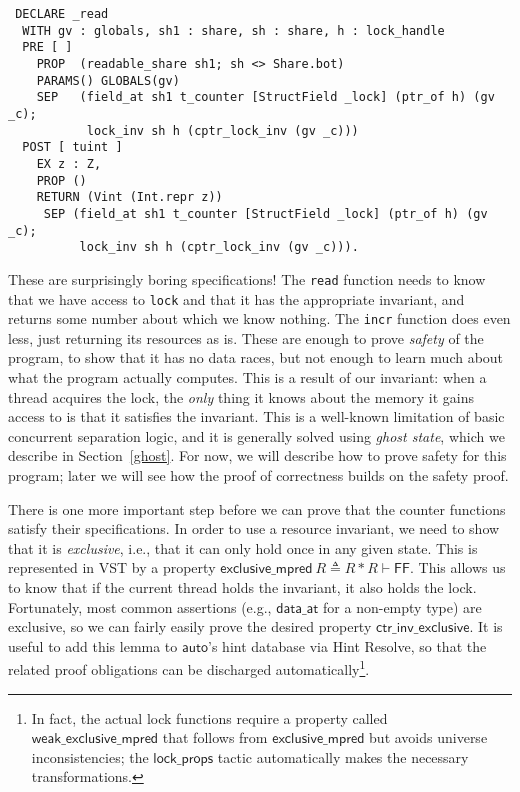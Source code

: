 \documentclass[11pt]{article}
\begin{document}
\begin{verbatim}
 DECLARE _read
  WITH gv : globals, sh1 : share, sh : share, h : lock_handle
  PRE [ ]
    PROP  (readable_share sh1; sh <> Share.bot)
    PARAMS() GLOBALS(gv)
    SEP   (field_at sh1 t_counter [StructField _lock] (ptr_of h) (gv _c);
           lock_inv sh h (cptr_lock_inv (gv _c)))
  POST [ tuint ]
    EX z : Z,
    PROP ()
    RETURN (Vint (Int.repr z))
     SEP (field_at sh1 t_counter [StructField _lock] (ptr_of h) (gv _c);
          lock_inv sh h (cptr_lock_inv (gv _c))).
\end{verbatim}
These are surprisingly boring specifications! The \texttt{read} function needs to know that we have access to \texttt{lock} and that it has the appropriate invariant, and returns some number about which we know nothing. The \texttt{incr} function does even less, just returning its resources as is. These are enough to prove \emph{safety} of the program, to show that it has no data races, but not enough to learn much about what the program actually computes. This is a result of our invariant: when a thread acquires the lock, the \emph{only} thing it knows about the memory it gains access to is that it satisfies the invariant. This is a well-known limitation of basic concurrent separation logic, and it is generally solved using \emph{ghost state}, which we describe in Section~\ref{ghost}. For now, we will describe how to prove safety for this program; later we will see how the proof of correctness builds on the safety proof.

There is one more important step before we can prove that the counter functions satisfy their specifications. In order to use a resource invariant, we need to show that it is \emph{exclusive}, i.e., that it can only hold once in any given state. This is represented in VST by a property $\mathsf{exclusive\_mpred}\ R \triangleq R * R \vdash \mathsf{FF}$. This allows us to know that if the current thread holds the invariant, it also holds the lock. Fortunately, most common assertions (e.g., $\mathsf{data\_at}$ for a non-empty type) are exclusive, so we can fairly easily prove the desired property $\mathsf{ctr\_inv\_exclusive}$. It is useful to add this lemma to $\mathsf{auto}$'s hint database via \textsf{Hint Resolve}, so that the related proof obligations can be discharged automatically\footnote{In fact, the actual lock functions require a property called $\mathsf{weak\_exclusive\_mpred}$ that follows from $\mathsf{exclusive\_mpred}$ but avoids universe inconsistencies; the $\mathsf{lock\_props}$ tactic automatically makes the necessary transformations.}.
\end{document}
